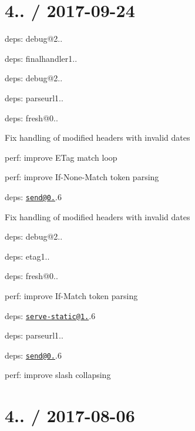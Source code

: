 \section*{4.. / 2017-\/09-\/24 }


\begin{DoxyItemize}
\item deps\+: debug@2..
\item deps\+: finalhandler1..
\begin{DoxyItemize}
\item deps\+: debug@2..
\item deps\+: parseurl1..
\end{DoxyItemize}
\item deps\+: fresh@0..
\begin{DoxyItemize}
\item Fix handling of modified headers with invalid dates
\item perf\+: improve E\+Tag match loop
\item perf\+: improve {\ttfamily If-\/\+None-\/\+Match} token parsing
\end{DoxyItemize}
\item deps\+: \href{mailto:send@0.15}{\tt send@0.}.6
\begin{DoxyItemize}
\item Fix handling of modified headers with invalid dates
\item deps\+: debug@2..
\item deps\+: etag1..
\item deps\+: fresh@0..
\item perf\+: improve {\ttfamily If-\/\+Match} token parsing
\end{DoxyItemize}
\item deps\+: \href{mailto:serve-static@1.12}{\tt serve-\/static@1.}.6
\begin{DoxyItemize}
\item deps\+: parseurl1..
\item deps\+: \href{mailto:send@0.15}{\tt send@0.}.6
\item perf\+: improve slash collapsing
\end{DoxyItemize}
\end{DoxyItemize}

\section*{4.. / 2017-\/08-\/06 }


